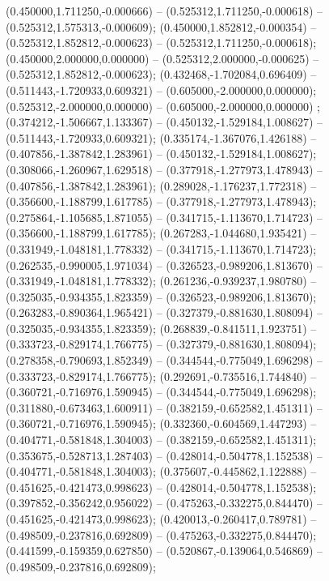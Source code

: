  (0.450000,1.711250,-0.000666) -- (0.525312,1.711250,-0.000618) -- (0.525312,1.575313,-0.000609);
 (0.450000,1.852812,-0.000354) -- (0.525312,1.852812,-0.000623) -- (0.525312,1.711250,-0.000618);
 (0.450000,2.000000,0.000000) -- (0.525312,2.000000,-0.000625) -- (0.525312,1.852812,-0.000623);
 (0.432468,-1.702084,0.696409) -- (0.511443,-1.720933,0.609321) -- (0.605000,-2.000000,0.000000);
 (0.525312,-2.000000,0.000000) -- (0.605000,-2.000000,0.000000) ;
 (0.374212,-1.506667,1.133367) -- (0.450132,-1.529184,1.008627) -- (0.511443,-1.720933,0.609321);
 (0.335174,-1.367076,1.426188) -- (0.407856,-1.387842,1.283961) -- (0.450132,-1.529184,1.008627);
 (0.308066,-1.260967,1.629518) -- (0.377918,-1.277973,1.478943) -- (0.407856,-1.387842,1.283961);
 (0.289028,-1.176237,1.772318) -- (0.356600,-1.188799,1.617785) -- (0.377918,-1.277973,1.478943);
 (0.275864,-1.105685,1.871055) -- (0.341715,-1.113670,1.714723) -- (0.356600,-1.188799,1.617785);
 (0.267283,-1.044680,1.935421) -- (0.331949,-1.048181,1.778332) -- (0.341715,-1.113670,1.714723);
 (0.262535,-0.990005,1.971034) -- (0.326523,-0.989206,1.813670) -- (0.331949,-1.048181,1.778332);
 (0.261236,-0.939237,1.980780) -- (0.325035,-0.934355,1.823359) -- (0.326523,-0.989206,1.813670);
 (0.263283,-0.890364,1.965421) -- (0.327379,-0.881630,1.808094) -- (0.325035,-0.934355,1.823359);
 (0.268839,-0.841511,1.923751) -- (0.333723,-0.829174,1.766775) -- (0.327379,-0.881630,1.808094);
 (0.278358,-0.790693,1.852349) -- (0.344544,-0.775049,1.696298) -- (0.333723,-0.829174,1.766775);
 (0.292691,-0.735516,1.744840) -- (0.360721,-0.716976,1.590945) -- (0.344544,-0.775049,1.696298);
 (0.311880,-0.673463,1.600911) -- (0.382159,-0.652582,1.451311) -- (0.360721,-0.716976,1.590945);
 (0.332360,-0.604569,1.447293) -- (0.404771,-0.581848,1.304003) -- (0.382159,-0.652582,1.451311);
 (0.353675,-0.528713,1.287403) -- (0.428014,-0.504778,1.152538) -- (0.404771,-0.581848,1.304003);
 (0.375607,-0.445862,1.122888) -- (0.451625,-0.421473,0.998623) -- (0.428014,-0.504778,1.152538);
 (0.397852,-0.356242,0.956022) -- (0.475263,-0.332275,0.844470) -- (0.451625,-0.421473,0.998623);
 (0.420013,-0.260417,0.789781) -- (0.498509,-0.237816,0.692809) -- (0.475263,-0.332275,0.844470);
 (0.441599,-0.159359,0.627850) -- (0.520867,-0.139064,0.546869) -- (0.498509,-0.237816,0.692809);
